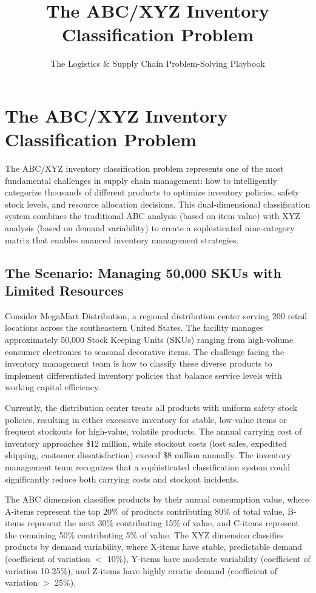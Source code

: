 \documentclass{article}
\title{The ABC/XYZ Inventory Classification Problem}
\author{The Logistics \& Supply Chain Problem-Solving Playbook}
\date{}
\begin{document}
\maketitle

\section{The ABC/XYZ Inventory Classification Problem}

The ABC/XYZ inventory classification problem represents one of the most fundamental challenges in supply chain management: how to intelligently categorize thousands of different products to optimize inventory policies, safety stock levels, and resource allocation decisions. This dual-dimensional classification system combines the traditional ABC analysis (based on item value) with XYZ analysis (based on demand variability) to create a sophisticated nine-category matrix that enables nuanced inventory management strategies.

\subsection{The Scenario: Managing 50,000 SKUs with Limited Resources}

Consider MegaMart Distribution, a regional distribution center serving 200 retail locations across the southeastern United States. The facility manages approximately 50,000 Stock Keeping Units (SKUs) ranging from high-volume consumer electronics to seasonal decorative items. The challenge facing the inventory management team is how to classify these diverse products to implement differentiated inventory policies that balance service levels with working capital efficiency.

Currently, the distribution center treats all products with uniform safety stock policies, resulting in either excessive inventory for stable, low-value items or frequent stockouts for high-value, volatile products. The annual carrying cost of inventory approaches \$12 million, while stockout costs (lost sales, expedited shipping, customer dissatisfaction) exceed \$8 million annually. The inventory management team recognizes that a sophisticated classification system could significantly reduce both carrying costs and stockout incidents.

The ABC dimension classifies products by their annual consumption value, where A-items represent the top 20\% of products contributing 80\% of total value, B-items represent the next 30\% contributing 15\% of value, and C-items represent the remaining 50\% contributing 5\% of value. The XYZ dimension classifies products by demand variability, where X-items have stable, predictable demand (coefficient of variation $<$ 10\%), Y-items have moderate variability (coefficient of variation 10-25\%), and Z-items have highly erratic demand (coefficient of variation $>$ 25\%).
\end{document}
